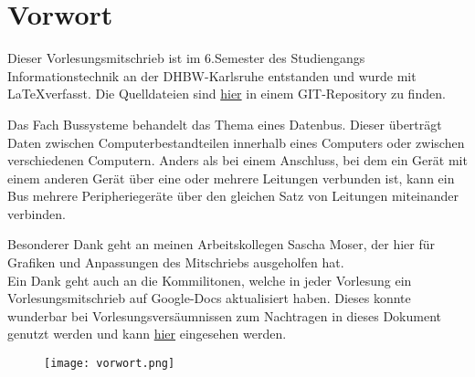 \chapter*{Vorwort}
Dieser Vorlesungsmitschrieb ist im 6.Semester des Studiengangs Informationstechnik an der DHBW-Karlsruhe entstanden und wurde mit \LaTeX verfasst. Die Quelldateien sind \href{https://github.com/julses/Bussysteme}{hier} in einem GIT-Repository zu finden.
\par
Das Fach Bussysteme behandelt das Thema eines Datenbus. Dieser überträgt Daten zwischen Computerbestandteilen innerhalb eines Computers oder zwischen verschiedenen Computern. Anders als bei einem Anschluss, bei dem ein Gerät mit einem anderen Gerät über eine oder mehrere Leitungen verbunden ist, kann ein Bus mehrere Peripheriegeräte über den gleichen Satz von Leitungen miteinander verbinden.
\par
Besonderer Dank geht an meinen Arbeitskollegen Sascha Moser, der hier für Grafiken und Anpassungen des Mitschriebs ausgeholfen hat.\\
Ein Dank geht auch an die Kommilitonen, welche in jeder Vorlesung ein Vorlesungsmitschrieb auf Google-Docs aktualisiert haben. Dieses konnte wunderbar bei Vorlesungsversäumnissen zum Nachtragen in dieses Dokument genutzt werden und kann \href{https://www.google.com/url?q=https%3A%2F%2Fdocs.google.com%2Fdocument%2Fd%2F1bVH2fVSst7iG3dhWXjIo6FsLtSjdwrZTV5Z2JXYnOfI%2Fedit%3Fusp%3Dsharing}{hier} eingesehen werden.
\begin{figure}[htbp]
  \centering
  \texttt{[image: vorwort.png]}
\end{figure}